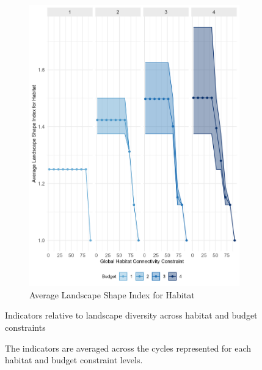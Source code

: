 \begin{figure}[h]
\begin{subfigure}[b]{.48\textwidth}
        \includegraphics[height = .3\textheight]{figures/wildland/average_LSI_B.jpg}
        \caption{Average Landscape Shape Index for Habitat}
        \label{fig:lsi}
    \end{subfigure}
    
    \caption{Indicators relative to landscape diversity across habitat and budget constraints}
    \caption*{The indicators are averaged across the cycles represented for each habitat and budget constraint levels.}
    \label{fig:indicators2}
\end{figure}


